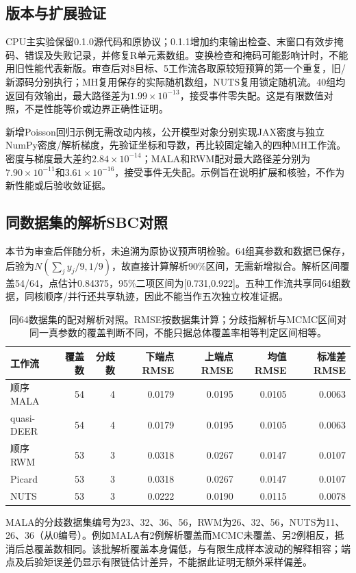 \subsection{版本与扩展验证}
CPU主实验保留0.1.0源代码和原协议；0.1.1增加约束输出检查、末窗口有效步掩码、错误及失败记录，并修复R单元素数组。变换检查和掩码可能影响计时，不能用旧性能代表新版。审查后对8目标、5工作流各取原较短预算的第一个重复，旧/新源码分别执行；MH复用保存的实际随机数组，NUTS复用锁定随机流。40组均返回有效输出，最大路径差为$1.99\times10^{-13}$，接受事件零失配。这是有限数值对照，不是性能等价或边界正确性证明。

新增Poisson回归示例无需改动内核，公开模型对象分别实现JAX密度与独立NumPy密度/解析梯度，先验证坐标和导数，再比较固定输入的四种MH工作流。密度与梯度最大差约$2.84\times10^{-14}$；MALA和RWM配对最大路径差分别为$7.90\times10^{-11}$和$3.61\times10^{-16}$，接受事件无失配。示例旨在说明扩展和核验，不作为新性能或后验收敛证据。

\subsection{同数据集的解析SBC对照}
本节为审查后伴随分析，未追溯为原协议预声明检验。64组真参数和数据已保存，后验为$N(\sum_j y_j/9,1/9)$，故直接计算解析90\%区间，无需新增拟合。解析区间覆盖54/64，点估计0.84375，95\%二项区间为[0.731,0.922]。五种工作流共享同64组数据，同核顺序/并行还共享轨迹，因此不能当作五次独立校准证据。

\begin{table}[htbp]\centering\small\setlength{\tabcolsep}{4pt}
\begin{tabular}{lrrrrrr}\toprule
工作流 & 覆盖数 & 分歧数 & 下端点RMSE & 上端点RMSE & 均值RMSE & 标准差RMSE\\\midrule

顺序MALA & 54 & 4 & 0.0179 & 0.0195 & 0.0105 & 0.0063\\

quasi-DEER & 54 & 4 & 0.0179 & 0.0195 & 0.0105 & 0.0063\\

顺序RWM & 53 & 3 & 0.0318 & 0.0267 & 0.0147 & 0.0107\\

Picard & 53 & 3 & 0.0318 & 0.0267 & 0.0147 & 0.0107\\

NUTS & 53 & 3 & 0.0222 & 0.0190 & 0.0115 & 0.0078\\

\bottomrule\end{tabular}
\caption{同64数据集的配对解析对照。RMSE按数据集计算；分歧指解析与MCMC区间对同一真参数的覆盖判断不同，不能只据总体覆盖率相等判定区间相等。}
\end{table}
MALA的分歧数据集编号为23、32、36、56，RWM为26、32、56，NUTS为11、26、36（从0编号）。例如MALA有2例解析覆盖而MCMC未覆盖、另2例相反，抵消后总覆盖数相同。该批解析覆盖本身偏低，与有限生成样本波动的解释相容；端点及后验矩误差仍显示有限链估计差异，不能据此证明无额外采样偏差。

